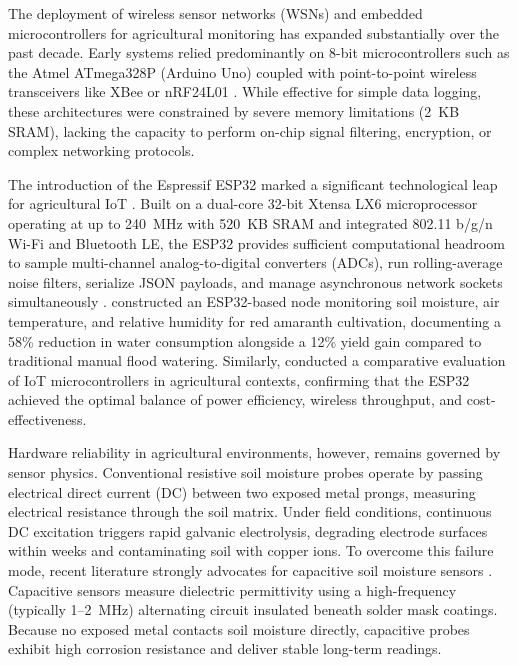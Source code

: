 \documentclass[12pt, a4paper]{article}
\begin{document}
The deployment of wireless sensor networks (WSNs) and embedded microcontrollers for agricultural monitoring has expanded substantially over the past decade. Early systems relied predominantly on 8-bit microcontrollers such as the Atmel ATmega328P (Arduino Uno) coupled with point-to-point wireless transceivers like XBee or nRF24L01 \citep{naji2021}. While effective for simple data logging, these architectures were constrained by severe memory limitations (2~KB SRAM), lacking the capacity to perform on-chip signal filtering, encryption, or complex networking protocols.

The introduction of the Espressif ESP32 marked a significant technological leap for agricultural IoT \citep{rajpoot2022}. Built on a dual-core 32-bit Xtensa LX6 microprocessor operating at up to 240~MHz with 520~KB SRAM and integrated 802.11 b/g/n Wi-Fi and Bluetooth LE, the ESP32 provides sufficient computational headroom to sample multi-channel analog-to-digital converters (ADCs), run rolling-average noise filters, serialize JSON payloads, and manage asynchronous network sockets simultaneously \citep{singha2025}. \citet{singha2025} constructed an ESP32-based node monitoring soil moisture, air temperature, and relative humidity for red amaranth cultivation, documenting a 58\% reduction in water consumption alongside a 12\% yield gain compared to traditional manual flood watering. Similarly, \citet{rajpoot2022} conducted a comparative evaluation of IoT microcontrollers in agricultural contexts, confirming that the ESP32 achieved the optimal balance of power efficiency, wireless throughput, and cost-effectiveness.

Hardware reliability in agricultural environments, however, remains governed by sensor physics. Conventional resistive soil moisture probes operate by passing electrical direct current (DC) between two exposed metal prongs, measuring electrical resistance through the soil matrix. Under field conditions, continuous DC excitation triggers rapid galvanic electrolysis, degrading electrode surfaces within weeks and contaminating soil with copper ions. To overcome this failure mode, recent literature strongly advocates for capacitive soil moisture sensors \citep{naji2021}. Capacitive sensors measure dielectric permittivity using a high-frequency (typically 1--2~MHz) alternating circuit insulated beneath solder mask coatings. Because no exposed metal contacts soil moisture directly, capacitive probes exhibit high corrosion resistance and deliver stable long-term readings.
\end{document}
